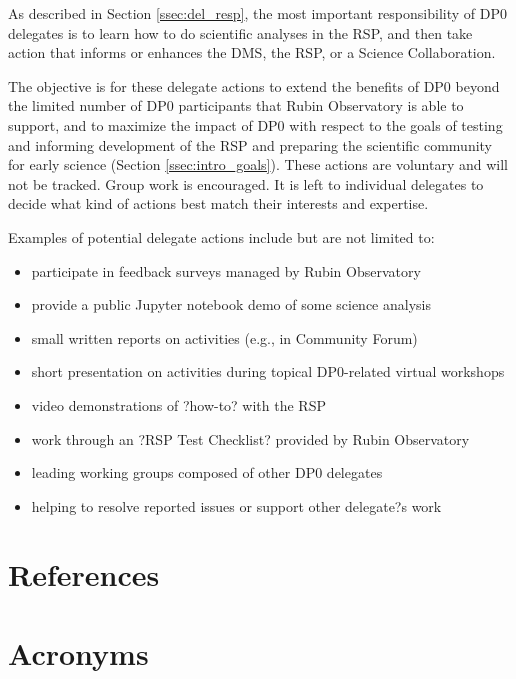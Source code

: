 \documentclass[DM,authoryear,toc]{lsstdoc}
\begin{document}
As described in Section \ref{ssec:del_resp}, the most important responsibility of DP0 delegates is to learn how to do scientific analyses in the RSP, and then take action that informs or enhances the DMS, the RSP, or a Science Collaboration. 

The objective is for these delegate actions to extend the benefits of DP0 beyond the limited number of DP0 participants that Rubin Observatory is able to support, and to maximize the impact of DP0 with respect to the goals of testing and informing development of the RSP and preparing the scientific community for early science (Section \ref{ssec:intro_goals}). 
These actions are voluntary and will not be tracked.
Group work is encouraged.
It is left to individual delegates to decide what kind of actions best match their interests and expertise. 

Examples of potential delegate actions include but are not limited to:
\begin{itemize}
\item participate in feedback surveys managed by Rubin Observatory
\item provide a public Jupyter notebook demo of some science analysis
\item small written reports on activities (e.g., in Community Forum)
\item short presentation on activities during topical DP0-related virtual workshops
\item video demonstrations of ?how-to? with the RSP
\item work through an ?RSP Test Checklist? provided by Rubin Observatory
\item leading working groups composed of other DP0 delegates
\item helping to resolve reported issues or support other delegate?s work
\end{itemize}


\appendix
\section{References} \label{sec:bib}
\renewcommand{\refname}{} %


\section{Acronyms}



% 
\end{document}
